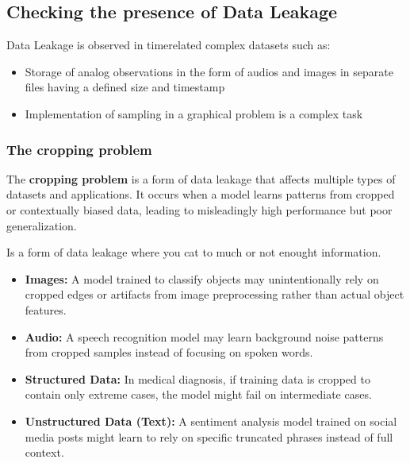 \documentclass{report}
\begin{document}
\subsection{Checking the presence of Data Leakage}
Data Leakage is observed in timerelated complex datasets such as: 
\begin{itemize}
    \item Storage of analog observations in the form of audios and images in separate files having a defined size and timestamp
    \item Implementation of sampling in a graphical problem is a complex task
\end{itemize}


\subsubsection{The cropping problem}
\noindent The \textbf{cropping problem} is a form of data leakage that affects multiple types of datasets and applications. It occurs when a model learns patterns from cropped or contextually biased data, leading to misleadingly high performance but poor generalization.

\noindent Is a form of data leakage where you cat to much or not enought information.

\begin{itemize}
    \item \textbf{Images:} A model trained to classify objects may unintentionally rely on cropped edges or artifacts from image preprocessing rather than actual object features.
    \item \textbf{Audio: } A speech recognition model may learn background noise patterns from cropped samples instead of focusing on spoken words.
    \item \textbf{Structured Data:} In medical diagnosis, if training data is cropped to contain only extreme cases, the model might fail on intermediate cases.
    \item \textbf{Unstructured Data (Text):}  A sentiment analysis model trained on social media posts might learn to rely on specific truncated phrases instead of full context.
\end{itemize}
\end{document}
